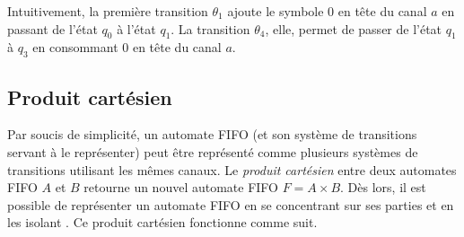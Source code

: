 \begin{example}
  Intuitivement, la première transition $\theta_1$ ajoute le symbole $0$ en tête du canal $a$ en passant de l'état $q_0$ à l'état $q_1$. La transition $\theta_4$, elle, permet de passer de l'état $q_1$ à $q_3$ en consommant $0$ en tête du canal $a$.

\end{example}



\subsection{Produit cartésien}\label{ss:cartesien}

Par soucis de simplicité, un automate FIFO (et son système de transitions servant à le représenter) peut être représenté comme plusieurs systèmes de transitions utilisant les mêmes canaux. Le \emph{produit cartésien} entre deux automates FIFO $A$ et $B$ retourne un nouvel automate FIFO $F=A \times B$. Dès lors, il est possible de représenter un automate FIFO en se concentrant sur ses parties et en les isolant \cite{Suresh20}. Ce produit cartésien fonctionne comme suit.

